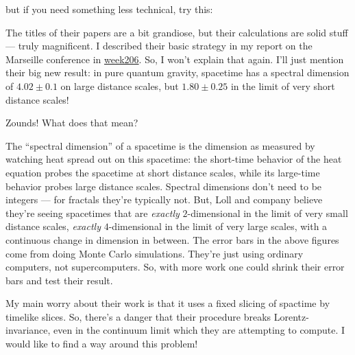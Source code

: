 \documentclass{article}
\def\tightlist{}
\renewcommand{\texttt}[1]{%
  \begingroup
  \ttfamily
  \begingroup\lccode`~=`/\lowercase{\endgroup\def~}{/\discretionary{}{}{}}%
  \begingroup\lccode`~=`[\lowercase{\endgroup\def~}{[\discretionary{}{}{}}%
  \begingroup\lccode`~=`.\lowercase{\endgroup\def~}{.\discretionary{}{}{}}%
  \catcode`/=\active\catcode`[=\active\catcode`.=\active
  \scantokens{#1\noexpand}%
  \endgroup
}
\begin{document}

but if you need something less technical, try this:


The titles of their papers are a bit grandiose, but their calculations
are solid stuff --- truly magnificent. I described their basic strategy
in my report on the Marseille conference in
\href{week206.html}{week206}. So, I won't explain that again. I'll just
mention their big new result: in pure quantum gravity, spacetime has a
spectral dimension of \(4.02\pm0.1\) on large distance scales, but
\(1.80\pm0.25\) in the limit of very short distance scales!

Zounds! What does that mean?

The ``spectral dimension'' of a spacetime is the dimension as measured
by watching heat spread out on this spacetime: the short-time behavior
of the heat equation probes the spacetime at short distance scales,
while its large-time behavior probes large distance scales. Spectral
dimensions don't need to be integers --- for fractals they're typically
not. But, Loll and company believe they're seeing spacetimes that are
\emph{exactly} \(2\)-dimensional in the limit of very small distance
scales, \emph{exactly} \(4\)-dimensional in the limit of very large
scales, with a continuous change in dimension in between. The error bars
in the above figures come from doing Monte Carlo simulations. They're
just using ordinary computers, not supercomputers. So, with more work
one could shrink their error bars and test their result.

My main worry about their work is that it uses a fixed slicing of
spactime by timelike slices. So, there's a danger that their procedure
breaks Lorentz-invariance, even in the continuum limit which they are
attempting to compute. I would like to find a way around this problem!
\end{document}
